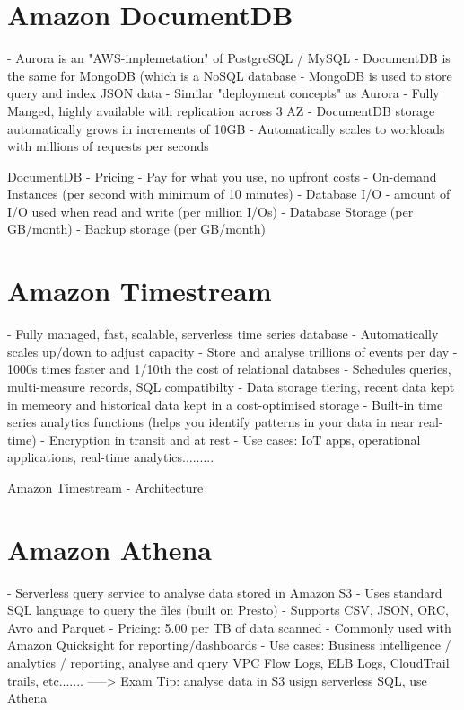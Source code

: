 \documentclass[11pt]{book}
\begin{document}
    \section{Amazon DocumentDB}
    - Aurora is an "AWS-implemetation" of PostgreSQL / MySQL
    - DocumentDB is the same for MongoDB (which is a NoSQL database
    - MongoDB is used to store query and index JSON data
    - Similar "deployment concepts" as Aurora
    - Fully Manged, highly available with replication across 3 AZ
    - DocumentDB storage automatically grows in increments of 10GB
    - Automatically scales to workloads with millions of requests per seconds

    DocumentDB - Pricing
    - Pay for what you use, no upfront costs
    - On-demand Instances (per second with minimum of 10 minutes)
    - Database I/O - amount of I/O used when read and write (per million I/Os)
    - Database Storage (per GB/month)
    - Backup storage (per GB/month)

    \section{Amazon Timestream}
    - Fully managed, fast, scalable, serverless time series database
    - Automatically scales up/down to adjust capacity
    - Store and analyse trillions of events per day
    - 1000s times faster and 1/10th the cost of relational databses
    - Schedules queries, multi-measure records, SQL compatibilty
    - Data storage tiering, recent data kept in memeory and historical data kept in a cost-optimised storage
    - Built-in time series analytics functions (helps you identify patterns in your data in near real-time)
    - Encryption in transit and at rest
    - Use cases: IoT apps, operational applications, real-time analytics.........

    Amazon Timestream - Architecture

    \section{Amazon Athena}
    - Serverless query service to analyse data stored in Amazon S3
    - Uses standard SQL language to query the files (built on Presto)
    - Supports CSV, JSON, ORC, Avro and Parquet
    - Pricing: 5.00 per TB of data scanned
    - Commonly used with Amazon Quicksight for reporting/dashboards
    - Use cases: Business intelligence / analytics / reporting, analyse and query VPC Flow Logs, ELB Logs, CloudTrail trails, etc.......
    -----> Exam Tip: analyse data in S3 usign serverless SQL, use Athena
\end{document}
